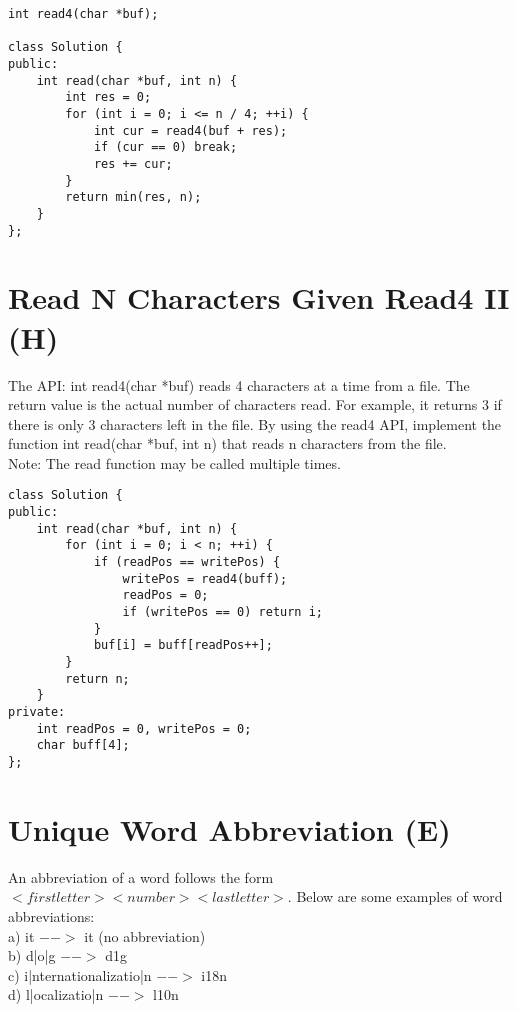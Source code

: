 \begin{lstlisting}
int read4(char *buf);

class Solution {
public:
    int read(char *buf, int n) {
        int res = 0;
        for (int i = 0; i <= n / 4; ++i) {
            int cur = read4(buf + res);
            if (cur == 0) break;
            res += cur;
        }
        return min(res, n);
    }
};
\end{lstlisting}


\section{Read N Characters Given Read4 II (H)}
The API: int read4(char *buf) reads 4 characters at a time from a file. The return value is the actual number of characters read. For example, it returns 3 if there is only 3 characters left in the file. By using the read4 API, implement the function int read(char *buf, int n) that reads n characters from the file.\\

Note: The read function may be called multiple times. \\

\begin{lstlisting}
class Solution {
public:
    int read(char *buf, int n) {
        for (int i = 0; i < n; ++i) {
            if (readPos == writePos) {
                writePos = read4(buff);
                readPos = 0;
                if (writePos == 0) return i;
            }
            buf[i] = buff[readPos++];
        }
        return n;
    }
private:
    int readPos = 0, writePos = 0;
    char buff[4];
};
\end{lstlisting}


\section{Unique Word Abbreviation (E)}
An abbreviation of a word follows the form $<first letter><number><last letter>$. Below are some examples of word abbreviations:\\

a) it                     $ -->$ it    (no abbreviation)\\

b) d|o|g                   $-->$ d1g\\

c) i|nternationalizatio|n  $-->$ i18n\\

d) l|ocalizatio|n          $-->$ l10n\\


